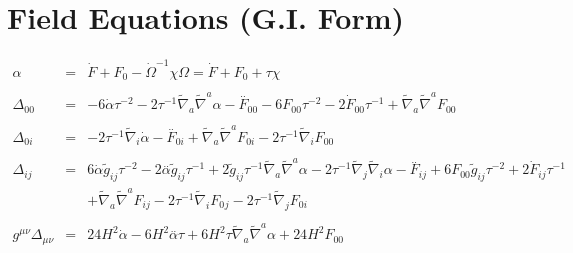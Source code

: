 \documentclass[10pt,letterpaper]{article}
\numberwithin{equation}{section}
\begin{document}
\section{Field Equations (G.I. Form)}
\begin{eqnarray}
\alpha &=&\dot{F} + F_{0}{} -  \dot{\Omega}^{-1} \chi \Omega  = \dot{F} + F_{0}{} + \tau \chi  
\\ \nonumber\\
\Delta_{00}&=& -6 \dot{\alpha} \tau^{-2} - 2 \tau^{-1} \tilde{\nabla}_{a}\tilde{\nabla}^{a}\alpha - \overset{..}{F}_{00}{} - 6 F_{00}{} \tau^{-2} - 2 \dot{F}_{00}{} \tau^{-1} + \tilde{\nabla}_{a}\tilde{\nabla}^{a}F_{00}{}
\\  \nonumber\\ 
\Delta_{0i}&=& -2 \tau^{-1} \tilde{\nabla}_{i}\dot{\alpha}- \overset{..}{F}_{0i}{} + \tilde{\nabla}_{a}\tilde{\nabla}^{a}F_{0i}{} - 2 \tau^{-1} \tilde{\nabla}_{i}F_{00}{}
\\  \nonumber\\ 
\Delta_{ij}&=& 6 \dot{\alpha} \tilde{g}_{ij} \tau^{-2} - 2 \overset{..}{\alpha} \tilde{g}_{ij} \tau^{-1} + 2 \tilde{g}_{ij} \tau^{-1} \tilde{\nabla}_{a}\tilde{\nabla}^{a}\alpha - 2 \tau^{-1} \tilde{\nabla}_{j}\tilde{\nabla}_{i}\alpha - \overset{..}{F}_{ij} + 6 F_{00}{} \tilde{g}_{ij} \tau^{-2} + 2 \dot{F}_{ij} \tau^{-1} \nonumber \\ 
&& + \tilde{\nabla}_{a}\tilde{\nabla}^{a}F_{ij} - 2 \tau^{-1} \tilde{\nabla}_{i}F_{0}{}_{j} - 2 \tau^{-1} \tilde{\nabla}_{j}F_{0i}{}
\\  \nonumber\\ 
g^{\mu\nu}\Delta_{\mu\nu}&=& 24 H^2 \dot{\alpha} - 6 H^2 \overset{..}{\alpha} \tau + 6 H^2 \tau \tilde{\nabla}_{a}\tilde{\nabla}^{a}\alpha +24 H^2 F_{00}{}
\end{eqnarray}
%
\end{document}
